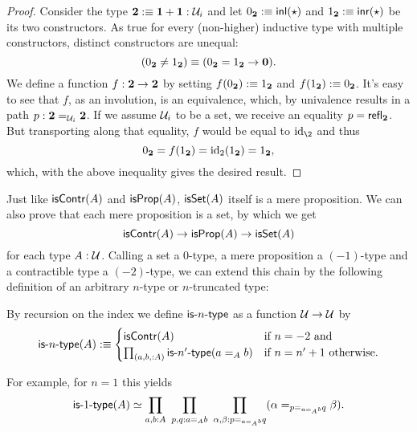 \begin{proof}
Consider the type $\mathbf{2} :\equiv \mathbf{1} + \mathbf{1} : \mathcal{U}_i$ and let
$0_{\mathbf{2}} :\equiv \mathsf{inl}(\star)$ and $1_{\mathbf{2}} :\equiv \mathsf{inr}(\star)$ be its
two constructors.
As true for every (non-higher) inductive type with multiple constructors,
distinct constructors are unequal:
\begin{equation*}
(0_{\mathbf{2}} \neq 1_{\mathbf{2}}) \equiv (0_{\mathbf{2}} = 1_{\mathbf{2}} \to \mathbf{0}) \text{.}
\end{equation*}
We define a function $f : \mathbf{2} \to \mathbf{2}$ by setting $f(0_{\mathbf{2}}) :\equiv 1_{\mathbf{2}}$
and $f(1_{\mathbf{2}}) :\equiv 0_{\mathbf{2}}$.
It's easy to see that $f$, as an involution, is an equivalence, which, by univalence
results in a path $p : \mathbf{2} =_{\mathcal{U}_i} \mathbf{2}$.
If we assume $\mathcal{U}_i$ to be a set, we receive an equality $p = \mathsf{refl}_{\mathbf{2}}$.
But transporting along that equality, $f$ would be equal to $\id_\2$ and thus
\begin{equation*}
0_{\mathbf{2}} = f(1_{\mathbf{2}}) = \operatorname{id}_2(1_{\mathbf{2}}) = 1_{\mathbf{2}} \text{,}
\end{equation*}
which, with the above inequality gives the desired result.
\end{proof}

Just like $\mathsf{isContr}(A)$ and $\mathsf{isProp}(A)$, $\mathsf{isSet}(A)$ itself is a mere proposition.
We can also prove that each mere proposition is a set, by which we get
\begin{equation*}
\mathsf{isContr}(A) \to \mathsf{isProp}(A) \to \mathsf{isSet}(A)
\end{equation*}
for each type $A : \mathcal{U}$. Calling a set a 0-type, a mere proposition a $(-1)$-type
and a contractible type a $(-2)$-type, we can extend this chain by the following
definition of an arbitrary $n$-type or $n$-truncated type:
\begin{defn}
By recursion on the index we define $\mathsf{is}\mbox{-}{n}\mbox{-}\mathsf{type}$ as a function $\mathcal{U} \to \mathcal{U}$ by
\begin{equation*}
\mathsf{is}\mbox{-}{n}\mbox{-}\mathsf{type}(A) :\equiv \begin{cases}
\mathsf{isContr}(A) & \text{if $n = -2$ and} \\
\prod_{(a, b, : A)} \mathsf{is}\mbox{-}{n'}\mbox{-}\mathsf{type}(a =_A b) & \text{if $n = n' + 1$ otherwise.}
\end{cases}
\end{equation*}
\end{defn}

For example, for $n = 1$ this yields
\begin{equation*}
\mathsf{is}\mbox{-}{1}\mbox{-}\mathsf{type}(A) \simeq \prod_{a, b : A} ~ \prod_{p, q : a =_A b}
	~ \prod_{\alpha, \beta : p =_{a =_A b} q} (\alpha =_{p =_{a =_A b} q} \beta) \text{.}
\end{equation*}

